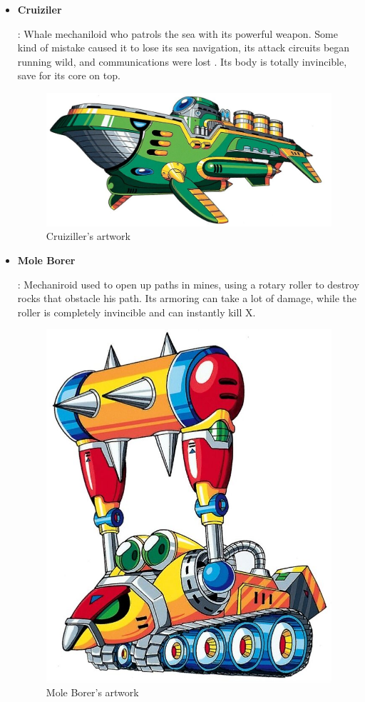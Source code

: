\begin{itemize}
		\item%
		 \hypertarget{enem:Cruiziler}{\textbf{Cruiziler}}: Whale mechaniloid who patrols the sea with its powerful weapon. Some kind of mistake caused it to lose its sea navigation, its attack circuits began running wild, and communications were lost \cite{wayback:X_resources}. Its body is totally invincible, save for its core on top.
		\begin{figure}[htp]
			\centering
			\includegraphics[width=0.6\linewidth]{figures/X1/enemies/Cruiziller.jpg}
			\caption{Cruiziller's artwork}
		\end{figure}
	
		\item \hypertarget{miniboss:Mole_Borer}{\textbf{Mole Borer}}:
		Mechaniroid used to open up paths in mines, using a 
		rotary roller to destroy rocks that obstacle his path\cite{wayback:X_resources}. Its armoring can take a lot of damage, while the roller is completely invincible and can instantly kill X.
		\begin{figure}[htp]
			\centering
			\includegraphics[width=0.4\linewidth]{figures/X1/enemies/MoleBorer.jpg}
			\caption{Mole Borer's artwork}
		\end{figure}
	

\end{itemize}
